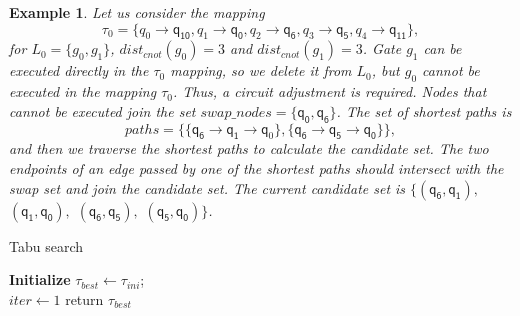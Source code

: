 \documentclass[journal]{IEEEtran}
\newtheorem{example}{Example}
\begin{document}
\begin{example}
	Let us consider the mapping $$\tau_{0}=\{\textit{q}_\textit{0}\rightarrow  \textsf{q}_{\textsf{10}},\textit{q}_\textit{1}\rightarrow \textsf{q}_{\textsf{0}},
\textit{q}_\textit{2}\rightarrow  \textsf{q}_{\textsf{6}},\textit{q}_\textit{3}\rightarrow  \textsf{q}_{\textsf{5}},\textit{q}_\textit{4}\rightarrow  \textsf{q}_{\textsf{11}}\} , $$ 
for $L_{0}=\{g_{0},g_{1}\}$, $dist_{cnot}(g_{0})=3$ and $dist_{cnot}(g_{1})=3$. 
Gate $g_{1}$ can be executed directly in the $\tau_{0}$ mapping, so we delete it from $L_{0}$,
but $g_{0}$ cannot be executed in the mapping $\tau_{0}$.
Thus, a circuit adjustment is required. 
Nodes that cannot be executed join the set $swap\_nodes=\{\textsf{q}_{\textsf{0}},\textsf{q}_\textsf{6}\}$.
The set of shortest paths is $$paths=\{\{\textsf{q}_{\textsf{6}}\rightarrow \textsf{q}_{\textsf{1}} \rightarrow \textsf{q}_{0} \},\{\textsf{q}_\textsf{6}\rightarrow \textsf{q}_\textsf{5} \rightarrow \textsf{q}_\textsf{0} \}\},$$ 
and then we traverse the shortest paths to calculate the  candidate set.
The two endpoints of an edge passed by one of the shortest paths should intersect with the swap set and join the candidate set.
The current candidate set is $\{(\textsf{q}_\textsf{6},\textsf{q}_\textsf{1}),$ $(\textsf{q}_\textsf{1},\textsf{q}_\textsf{0}),$ $(\textsf{q}_\textsf{6},\textsf{q}_\textsf{5}),$ $(\textsf{q}_\textsf{5},\textsf{q}_\textsf{0}) \}$.
\end{example}

	\begin{algorithm}[htbp]
			\caption{Tabu search }  
			\LinesNumbered  
			\textbf{Initialize}
				$\tau_{best}  \leftarrow \tau_{ini}$; \\
				$iter \leftarrow 1$  
      return $\tau_{best}$
      
		\label{algorithm_Tabu}
	\end{algorithm}
        
\end{document}
